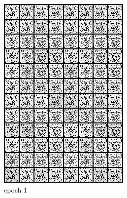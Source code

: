 \documentclass[a4paper]{article}
\theoremstyle{definition}
\newenvironment{soln}{
	\leavevmode\color{blue}\ignorespaces
}{}
\begin{document}
\begin{enumerate} [label=(\alph*)]
\begin{soln}
			\begin{figure}[H]
				\centering
				\begin{subfigure}[b]{0.3\textwidth}
					\centering
					\includegraphics[width=\textwidth]{../outputs/gen_img1.png}
					\caption{epoch 1}
				\end{subfigure}
				\hfill
				\begin{subfigure}[b]{0.3\textwidth}
					\centering

\end{subfigure}
\end{figure}
\end{soln}
\end{enumerate}
\end{document}
